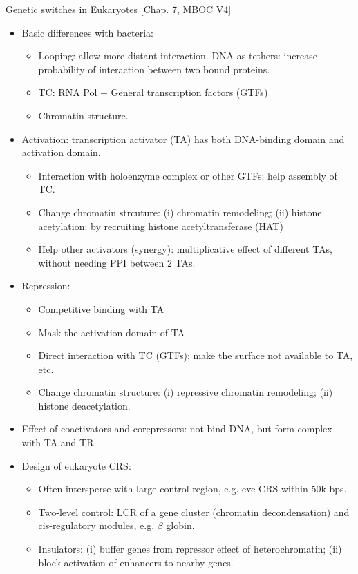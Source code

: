 \documentclass{report}
\begin{document}
Genetic switches in Eukaryotes [Chap. 7, MBOC V4]
\begin{itemize}
	\item Basic differences with bacteria: 
	\begin{itemize}
		\item Looping: allow more distant interaction. DNA as tethers: increase probability of interaction between two bound proteins. 
		\item TC: RNA Pol + General transcription factors (GTFs)
		\item Chromatin structure. 
	\end{itemize}
	\item Activation: transcription activator (TA) has both DNA-binding domain and activation domain. 
	\begin{itemize}
		\item Interaction with holoenzyme complex or other GTFs: help assembly of TC. 
		\item Change chromatin strcuture: (i) chromatin remodeling; (ii) histone acetylation: by recruiting histone acetyltransferase (HAT)
		\item Help other activators (synergy): multiplicative effect of different TAs, without needing PPI between 2 TAs. 
	\end{itemize}
	\item Repression: 
	\begin{itemize}
		\item Competitive binding with TA
		\item Mask the activation domain of TA
		\item Direct interaction with TC (GTFs): make the surface not available to TA, etc. 
		\item Change chromatin structure: (i) repressive chromatin remodeling; (ii) histone deacetylation. 
	\end{itemize}
	\item Effect of coactivators and corepressors: not bind DNA, but form complex with TA and TR. 
	\item Design of eukaryote CRS: 
	\begin{itemize}
		\item Often intersperse with large control region, e.g. eve CRS within 50k bps. 
		\item Two-level control: LCR of a gene cluster (chromatin decondensation) and cis-regulatory modules, e.g. $\beta$ globin. 
		\item Insulators: (i) buffer genes from repressor effect of heterochromatin; (ii) block activation of enhancers to nearby genes. 
	\end{itemize}
\end{itemize}
\end{document}
